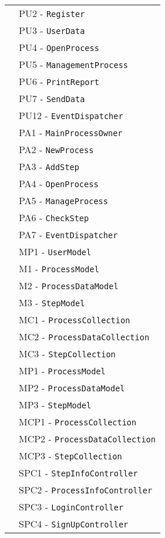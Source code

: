 \begin{longtable}{XX}
&PU2 - \texttt{Register}\\ 
&PU3 - \texttt{UserData}\\ 
&PU4 - \texttt{OpenProcess}\\ 
&PU5 - \texttt{ManagementProcess}\\ 
&PU6 - \texttt{PrintReport}\\ 
&PU7 - \texttt{SendData}\\ 
&PU12 - \texttt{EventDispatcher}\\
\midrule
\logicAdmin{}&PA1 - \texttt{MainProcessOwner}\\
&PA2 - \texttt{NewProcess}\\ 
&PA3 - \texttt{AddStep}\\ 
&PA4 - \texttt{OpenProcess}\\ 
&PA5 - \texttt{ManageProcess}\\ 
&PA6 - \texttt{CheckStep}\\ 
&PA7 - \texttt{EventDispatcher}\\ 

\midrule
\model{}&MP1 - \texttt{UserModel}\\
\midrule

\modelUser{}&M1 - \texttt{ProcessModel}\\
&M2 - \texttt{ProcessDataModel}\\
&M3 - \texttt{StepModel}\\
\midrule
\collectionu{}&MC1 - \texttt{{ProcessCollection}}\\
&MC2 - \texttt{{ProcessDataCollection}}\\
&MC3 - \texttt{{StepCollection}}\\
\midrule

\modelAdmin{}&MP1 - \texttt{ProcessModel}\\
&MP2 - \texttt{ProcessDataModel}\\
&MP3 - \texttt{StepModel}\\
\midrule
\collectionp{}&MCP1 - \texttt{{ProcessCollection}}\\
&MCP2 - \texttt{{ProcessDataCollection}}\\
&MCP3 - \texttt{{StepCollection}}\\
\midrule


\sCommon{}&SPC1 - \texttt{StepInfoController}\\
		&SPC2 - \texttt{ProcessInfoController}\\
		&SPC3 - \texttt{LoginController}\\
		&SPC4 - \texttt{SignUpController}\\
\midrule


\end{longtable}
